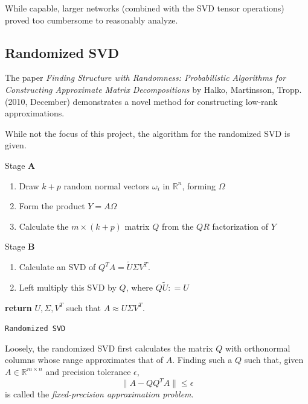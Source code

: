 \documentclass{article}
\begin{document}
While capable, larger networks (combined with the SVD tensor operations) proved too cumbersome to reasonably analyze.

\subsection{Randomized SVD}

The paper \emph{Finding Structure with Randomness: Probabilistic Algorithms for Constructing Approximate Matrix Decompositions} by Halko, Martinsson, Tropp. (2010, December) demonstrates a novel method for constructing low-rank approximations.

\bigskip

While not the focus of this project, the algorithm for the randomized SVD is given.
\begin{center}
	\begin{minipage}{0.5\linewidth} %
		\begin{algorithm}[H]
			\medskip
			Stage \textbf{A}
			\begin{enumerate}
				\item Draw $k+p$ random normal vectors $\omega_i$ in $\mathbb{R}^n$, forming $\Omega$
				\item Form the product $Y = A \Omega$
				\item Calculate the $m \times (k + p)$ matrix $Q$ from the $QR$ factorization of $Y$
			\end{enumerate}
			Stage \textbf{B}
			\begin{enumerate}
				\item Calculate an SVD of $Q^TA = \tilde{U} \Sigma V^T$.
				\item Left multiply this SVD by $Q$, where $Q\tilde{U} : = U$
			\end{enumerate}
			
			{\bf return} $U, \Sigma, V^T$ such that $A \approx U \Sigma V^T$.
			\caption{\texttt{Randomized SVD}} %
		\end{algorithm}
	\end{minipage}
\end{center}

Loosely, the randomized SVD first calculates the matrix $Q$ with orthonormal columns whose range approximates that of $A$.
Finding such a $Q$ such that, given $A\in\mathbb{R}^{m \times n}$ and precision tolerance $\epsilon$,
\[\| A - QQ^TA\| \leq \epsilon\]
is called the \textit{fixed-precision approximation problem}.
\end{document}
